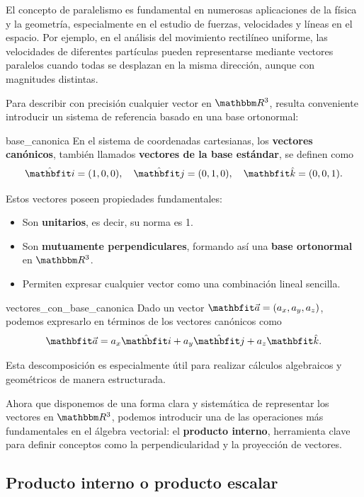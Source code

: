 El concepto de paralelismo es fundamental en numerosas aplicaciones de la física y la geometría, especialmente en el estudio de fuerzas, velocidades y líneas en el espacio. Por ejemplo, en el análisis del movimiento rectilíneo uniforme, las velocidades de diferentes partículas pueden representarse mediante vectores paralelos cuando todas se desplazan en la misma dirección, aunque con magnitudes distintas.

Para describir con precisión cualquier vector en $\RR[3]$, resulta conveniente introducir un sistema de referencia basado en una base ortonormal:

\begin{definition}{}{base_canonica}
    En el sistema de coordenadas cartesianas, los \textbf{vectores canónicos}, también llamados \textbf{vectores de la base estándar}, se definen como
    $$\veci = (1,0,0), \quad \vecj = (0,1,0), \quad \veck = (0,0,1).$$
\end{definition}

Estos vectores poseen propiedades fundamentales:

\begin{itemize}
    \item Son \textbf{unitarios}, es decir, su norma es 1.
    \item Son \textbf{mutuamente perpendiculares}, formando así una \textbf{base ortonormal} en $\RR[3]$.
    \item Permiten expresar cualquier vector como una combinación lineal sencilla.
\end{itemize}

\begin{definition}{}{vectores_con_base_canonica}
    Dado un vector $\veca = (a_x, a_y, a_z)$, podemos expresarlo en términos de los vectores canónicos como
    $$\veca = a_x\veci + a_y\vecj + a_z\veck.$$
\end{definition}

Esta descomposición es especialmente útil para realizar cálculos algebraicos y geométricos de manera estructurada.

Ahora que disponemos de una forma clara y sistemática de representar los vectores en $\RR[3]$, podemos introducir una de las operaciones más fundamentales en el álgebra vectorial: el \textbf{producto interno}, herramienta clave para definir conceptos como la perpendicularidad y la proyección de vectores.

\subsection{Producto interno o producto escalar}


